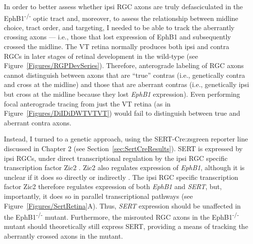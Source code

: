 \label{sec:EphB1Sert}
In order to better assess whether ipsi RGC axons are truly defasciculated in the EphB1\textsuperscript{-/-} optic tract and, moreover, to assess the relationship between midline choice, tract order, and targeting, I needed to be able to track the aberrantly crossing axons --- i.e., those that lost expression of EphB1 and subsequently crossed the midline.
The VT retina normally produces both ipsi and contra RGCs in later stages of retinal development in the wild-type (see Figure~\ref{Figures/RGPDevSeries}).
Therefore, anterograde labeling of RGC axons cannot distinguish between axons that are ``true'' contras (i.e., genetically contra and cross at the midline) and those that are aberrant contras (i.e., genetically ipsi but cross at the midline because they lost \emph{EphB1} expression).
Even performing focal anterograde tracing from just the VT retina (as in Figure~\ref{Figures/DiIDiDWTVTVT}) would fail to distinguish between true and aberrant contra axons.

Instead, I turned to a genetic approach, using the SERT-Cre:zsgreen reporter line discussed in Chapter 2 (see Section~\ref{sec:SertCreResults}).
SERT is expressed by ipsi RGCs, under direct transcriptional regulation by the ipsi RGC specific transcription factor Zic2 \cite{garcia2010zic2}.
Zic2 also regulates expression of \emph{EphB1}, although it is unclear if it does so directly or indirectly \cite{garcia2010zic2}.
The ipsi RGC specific transcription factor Zic2 therefore regulates expression of both \emph{EphB1} and \emph{SERT}, but, importantly, it does so in parallel transcriptional pathways (see Figure~\ref{Figures/SertRetina}A).
Thus, \emph{SERT} expression should be unaffected in the EphB1\textsuperscript{-/-} mutant.
Furthermore, the misrouted RGC axons in the EphB1\textsuperscript{-/-} mutant should theoretically still express SERT, providing a means of tracking the aberrantly crossed axons in the mutant.

